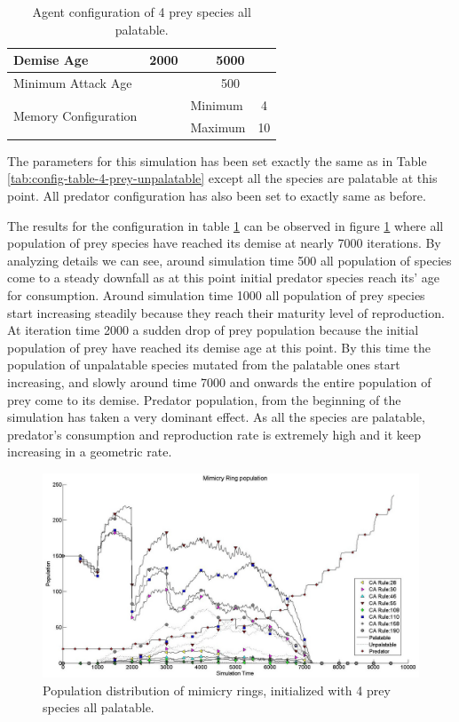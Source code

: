 \begin{table}[H]
\begin{tabular}{|l|l|c|c|l|c|}
  Demise Age	 									 & \multicolumn{3}{|c|}{2000}							& \multicolumn{2}{|c|}{5000} \\ \hline
  Minimum Attack Age						 & \multicolumn{3}{|c|}{} 						    & \multicolumn{2}{|c|}{500} \\ \hline
  \multirow{2}{*}{Memory Configuration} & \multicolumn{3}{|c|}{} 					& Minimum & 4 \\ \cline{5-6}
   																			& \multicolumn{3}{|c|}{} 					& Maximum & 10 \\ \hline  
\end{tabular}
\caption{Agent configuration of 4 prey species all palatable.}
\label{tab:config-table-4-prey-palatable}
\end{table}

The parameters for this simulation has been set exactly the same as in Table \ref{tab:config-table-4-prey-unpalatable} except all the species are palatable at this point. All predator configuration has also been set to exactly same as before.

The results for the configuration in table \ref{tab:config-table-4-prey-palatable} can be observed in figure \ref{fig:plot-4-prey-p} where all population of prey species have reached its demise at nearly 7000 iterations. By analyzing details we can see, around simulation time 500 all population of species come to a steady downfall as at this point initial predator species reach its' age for consumption. Around simulation time 1000 all population of prey species start increasing steadily because they reach their maturity level of reproduction. At iteration time 2000 a sudden drop of prey population because the initial population of prey have reached its demise age at this point. By this time the population of unpalatable species mutated from the palatable ones start increasing, and slowly around time 7000 and onwards the entire population of prey come to its demise. Predator population, from the beginning of the simulation has taken a very dominant effect. As all the species are palatable, predator's consumption and reproduction rate is extremely high and it keep increasing in a geometric rate.

\begin{figure}[H]
	\centering
	\includegraphics[scale=0.40]{images/simTime10k-4Prey-p}
	\caption[Population distribution of mimicry rings (4 prey species all palatable)]{Population distribution of mimicry rings, initialized with 4 prey species all palatable.}
	\label{fig:plot-4-prey-p}
\end{figure}

